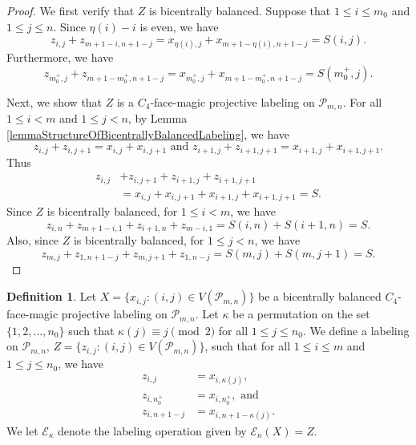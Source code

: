 \documentclass[12pt]{amsart}
\theoremstyle{definition}
\newtheorem{definition}{Definition}
\theoremstyle{plain}
\begin{document}
\begin{proof}
 We first verify that $Z$ is bicentrally balanced.
 Suppose that $1 \leqslant i \leqslant m_0$ and $1 \leqslant j \leqslant n$.
 Since $\eta(i)-i$ is even, we have
 \begin{equation*}
   z_{i,j} + z_{m+1-i,n+1-j} = x_{\eta(i),j} + x_{m+1-\eta(i),n+1-j}  =S(i,j).
 \end{equation*}
 Furthermore, we have
  \begin{equation*}
   z_{m_0^{+},j} + z_{m+1-m_0^{+},n+1-j} = x_{m_0^{+},j} + x_{m+1-m_0^{+},n+1-j}  = S(m^{+}_0,j).
 \end{equation*}

  Next, we show that $Z$ is a $C_4$-face-magic projective labeling on $\mathcal{P}_{m,n}$.
  For all $1 \leqslant i <m$ and $1 \leqslant j <n$, by Lemma \ref{lemmaStructureOfBicentrallyBalancedLabeling}, we have
  \begin{equation*}
    z_{i,j} + z_{i,j+1} = x_{i,j} + x_{i,j+1} \mbox{ \ and \ }  z_{i+1,j} + z_{i+1,j+1} = x_{i+1,j} + x_{i+1,j+1}.
  \end{equation*}
  Thus
  \begin{align*}
    z_{i,j} &+ z_{i,j+1} + z_{i+1,j} + z_{i+1,j+1} \\
    & = x_{i,j} + x_{i,j+1} + x_{i+1,j} + x_{i+1,j+1} =S.
  \end{align*}
  Since $Z$ is bicentrally balanced, for $1 \leqslant i <m$, we have
  \begin{equation*}
    z_{i,n} +z_{m+1-i,1} + z_{i+1,n} + z_{m-i,1} = S(i,n) + S(i+1,n) = S.
  \end{equation*}
  Also, since $Z$ is bicentrally balanced, for $1 \leqslant j < n$, we have
  \begin{equation*}
    z_{m,j} +z_{1,n+1-j} + z_{m,j+1} + z_{1,n-j} = S(m,j) + S(m,j+1) = S.
  \end{equation*}
\end{proof}

\begin{definition} \label{defnElementaryProjectivePermutationRows}
  Let $X=\{x_{i,j}:(i,j)\in V(\mathcal{P}_{m,n})\}$ be a bicentrally balanced $C_4$-face-magic projective labeling on $\mathcal{P}_{m,n}$.
  Let $\kappa$ be a permutation on the set $\{1,2,\ldots,n_0\}$ such that $\kappa(j)\equiv j \pmod{2}$ for all $1 \leqslant j \leqslant n_0$.
  We define a labeling on $\mathcal{P}_{m,n}$, $Z=\{z_{i,j}:(i,j)\in V(\mathcal{P}_{m,n})\}$,
  such that for all $1 \leqslant i \leqslant m$ and $1 \leqslant j \leqslant n_0$, we have
    \begin{align*}
      z_{i,j} &= x_{i,\kappa(j)},  \\
      z_{i,n_0^{+}} &= x_{i,n_0^{+}}, \mbox{ and } \\
      z_{i,n+1-j} &= x_{i,n+1-\kappa(j)}.
    \end{align*}
    We let $\mathcal{E}_{\kappa}$ denote the labeling operation given by $\mathcal{E}_{\kappa}(X)=Z$.
\end{definition}
\end{document}
